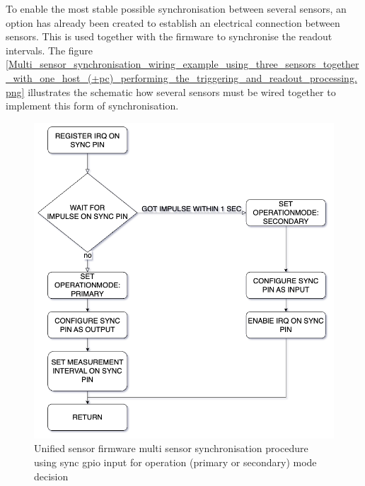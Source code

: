 To enable the most stable possible synchronisation between several
sensors, an option has already been created to establish an electrical
connection between sensors. This is used together with the firmware to
synchronise the readout intervals. The figure
\ref{Multi_sensor_synchronisation_wiring_example_using_three_sensors_together_with_one_host_(+pc)_performing_the_triggering_and_readout_processing.png}
illustrates the schematic how several sensors must be wired together to
implement this form of synchronisation.

\begin{figure}
\centering
\includegraphics{./generated_images/border_Unified_sensor_firmware_multi_sensor_synchronisation_procedure_using_sync_(+gpio)_input_for_operation_(primary_or_secondary)_mode_decision.png}
\caption{Unified sensor firmware multi sensor synchronisation procedure
using sync \gls{gpio} input for operation (primary or secondary) mode
decision
\label{Unified_sensor_firmware_multi_sensor_synchronisation_procedure_using_sync_(+gpio)_input_for_operation_(primary_or_secondary)_mode_decision.png}}
\end{figure}

